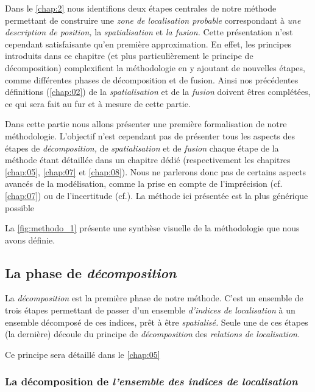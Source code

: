 Dans le \autoref{chap:2} nous identifions deux étapes centrales de
notre méthode permettant de construire une \emph{zone de localisation
  probable} correspondant à \emph{une description de position,} la
\emph{spatialisation} et \emph{la fusion.} Cette présentation n'est
cependant satisfaisante qu'en première approximation. En effet, les
principes introduits dans ce chapitre (et plus particulièrement le
principe de décomposition) complexifient la méthodologie en y ajoutant
de nouvelles étapes, comme différentes phases de décomposition et de
fusion. Ainsi nos précédentes définitions (\autoref{chap:02}) de la
\emph{spatialisation} et de la \emph{fusion} doivent êtres complétées,
ce qui sera fait au fur et à mesure de cette partie.

Dans cette partie nous allons présenter une première formalisation de
notre méthodologie. L'objectif n'est cependant pas de présenter tous
les aspects des étapes de \emph{décomposition,} de
\emph{spatialisation} et de \emph{fusion} chaque étape de la méthode
étant détaillée dans un chapitre dédié (respectivement les chapitres
\ref{chap:05}, \ref{chap:07} et \ref{chap:08}). Nous ne parlerons donc
pas de certains aspects avancés de la modélisation, comme la prise en
compte de l'imprécision (cf. \autoref{chap:07}) ou de l'incertitude
(cf.). La méthode ici présentée est la plus générique possible  

La \autoref{fig:methodo_1} présente une synthèse visuelle de la
méthodologie que nous avons définie.

\subsection{La phase de \emph{décomposition}}

La \emph{décomposition} est la première phase de notre méthode. C'est
un ensemble de trois étapes permettant de passer d'un ensemble
\emph{d'indices de localisation} à un ensemble décomposé de ces
indices, prêt à être \emph{spatialisé.} Seule une de ces étapes (la
dernière) découle du principe de \emph{décomposition} des
\emph{relations de localisation.}

Ce principe sera détaillé dans le \autoref{chap:05}

\subsubsection{La décomposition de \emph{l'ensemble des indices de
    localisation}}

